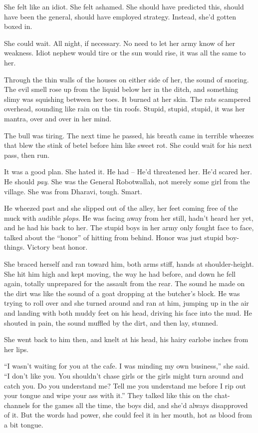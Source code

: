She felt like an idiot. She felt ashamed. She should have predicted
this, should have been the general, should have employed strategy.
Instead, she'd gotten boxed in.

She could wait. All night, if necessary. No need to let her army
know of her weakness. Idiot nephew would tire or the sun would
rise, it was all the same to her.

Through the thin walls of the houses on either side of her, the
sound of snoring. The evil smell rose up from the liquid below her
in the ditch, and something slimy was squishing between her toes.
It burned at her skin. The rats scampered overhead, sounding like
rain on the tin roofs. Stupid, stupid, stupid, it was her mantra,
over and over in her mind.

The bull was tiring. The next time he passed, his breath came in
terrible wheezes that blew the stink of betel before him like sweet
rot. She could wait for his next pass, then run.

It was a good plan. She hated it. He had -- He'd threatened her.
He'd scared her. He should \emph{pay}. She was the General
Robotwallah, not merely some girl from the village. She was from
Dharavi, tough. Smart.

He wheezed past and she slipped out of the alley, her feet coming
free of the muck with audible \emph{plops}. He was facing away from
her still, hadn't heard her yet, and he had his back to her. The
stupid boys in her army only fought face to face, talked about the
``honor'' of hitting from behind. Honor was just stupid boy-things.
Victory beat honor.

She braced herself and ran toward him, both arms stiff, hands at
shoulder-height. She hit him high and kept moving, the way he had
before, and down he fell again, totally unprepared for the assault
from the rear. The sound he made on the dirt was like the sound of
a goat dropping at the butcher's block. He was trying to roll over
and she turned around and ran at him, jumping up in the air and
landing with both muddy feet on his head, driving his face into the
mud. He shouted in pain, the sound muffled by the dirt, and then
lay, stunned.

She went back to him then, and knelt at his head, his hairy earlobe
inches from her lips.

``I wasn't waiting for you at the cafe. I was minding my own
business,'' she said. ``I don't like you. You shouldn't chase girls
or the girls might turn around and catch you. Do you understand me?
Tell me you understand me before I rip out your tongue and wipe
your ass with it.'' They talked like this on the chat-channels for
the games all the time, the boys did, and she'd always disapproved
of it. But the words had power, she could feel it in her mouth, hot
as blood from a bit tongue.

